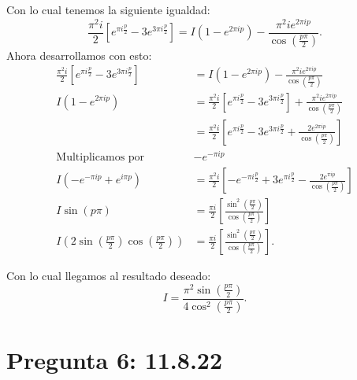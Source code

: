 \documentclass{report}
\begin{document}
Con lo cual tenemos la siguiente igualdad: \[
  \frac{\pi^2 i}{2}\left[ e^{\pi i \frac{p}{2}} - 3e^{3\pi i \frac{p}{2}} \right] =I\left( 1 - e^{2\pi i p} \right) - \frac{\pi^2ie^{2\pi ip}}{\cos\left( \frac{p\pi}{2} \right) }
  .\] Ahora desarrollamos con esto:
\begin{align*}
  \frac{\pi^2 i}{2}\left[ e^{\pi i \frac{p}{2}} - 3e^{3\pi i \frac{p}{2}} \right] &=I\left( 1 - e^{2\pi i p} \right) - \frac{\pi^2ie^{2\pi ip}}{\cos\left( \frac{p\pi}{2} \right) }\\
  I\left( 1 - e^{2\pi i p} \right) &= \frac{\pi^2 i}{2}\left[ e^{\pi i \frac{p}{2}} - 3e^{3\pi i \frac{p}{2}} \right] + \frac{\pi^2ie^{2\pi ip}}{\cos\left( \frac{p\pi}{2} \right) } \\
  &= \frac{\pi^2i}{2}\left[ e^{\pi i \frac{p}{2}} - 3e^{3\pi i \frac{p}{2}} + \frac{2e^{2 \pi i p}}{\cos\left( \frac{p\pi}{2} \right) } \right]  \\
  \text{Multiplicamos por }&-e^{-\pi i p}\\
  I\left( -e^{-\pi i p} + e^{i\pi p} \right)  &=  \frac{\pi^2i}{2}\left[ -e^{-\pi i \frac{p}{2}} + 3e^{\pi i \frac{p}{2}} - \frac{2e^{ \pi i p}}{\cos\left( \frac{p\pi}{2} \right) } \right]\\
  I\sin\left( p\pi \right) &= \frac{\pi i}{2}\left[ \frac{\sin^2\left( \frac{p \pi}{2} \right) }{\cos\left( \frac{p \pi}{2} \right) } \right]  \\
  I\left( 2\sin\left( \frac{p \pi}{2} \right) \cos\left( \frac{p \pi}{2} \right)  \right) &=  \frac{\pi i}{2}\left[ \frac{\sin^2\left( \frac{p \pi}{2} \right) }{\cos\left( \frac{p \pi}{2} \right) } \right]
.\end{align*}

Con lo cual llegamos al resultado deseado: \[
  I = \frac{\pi^2 \sin\left( \frac{p \pi}{2} \right)}{4 \cos^2\left( \frac{p\pi}{2} \right) }
  .\] 


\chapter{Pregunta 6: 11.8.22}

\end{document}
